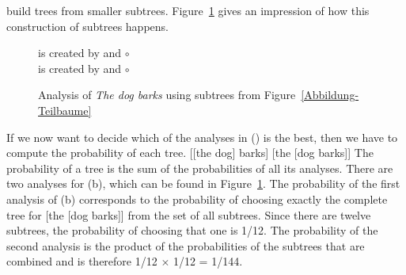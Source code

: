   build trees from smaller subtrees.
Figure~\ref{Abbildung-Analyse} gives an impression of how this construction of subtrees happens.
\begin{figure}
\hfill
{}
is created by
and
$\circ$
\hfill\mbox{}
\\[3ex]
\hfill{}
is created by
and
$\circ$
\hfill\mbox{}
\caption{\label{Abbildung-Analyse}Analysis of \emph{The dog barks} using subtrees from Figure~\ref{Abbildung-Teilbaume}}
\end{figure}%
If we now want to decide which of the analyses in () is the best, then we have to compute the probability of each tree.
\eal
\ex {}[[the dog] barks]
\ex {}[the [dog barks]]
\zl
The probability of a tree is the sum of the probabilities of all its analyses.
There are two analyses for (b), which can be found in Figure~\ref{Abbildung-Analyse}.
The probability of the first analysis of (b) corresponds to the probability of choosing exactly the complete tree for [the [dog barks]] from
the set of all subtrees. Since there are twelve subtrees, the probability of choosing that one is 1/12. The probability of the second
analysis is the product of the probabilities of the subtrees that are combined and is therefore 1/12 $\times$ 1/12 = 1/144.
